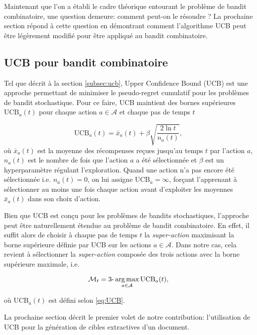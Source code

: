 Maintenant que l'on a établi le cadre théorique entourant le problème de bandit 
combinatoire, une question demeure: comment peut-on le résoudre ?
La prochaine section répond à cette question en démontrant 
comment l'algorithme UCB peut être légèrement modifié pour 
être appliqué au bandit combinatoire.

\subsection{UCB pour bandit combinatoire}

Tel que décrit à la section \ref{subsec:ucb}, Upper Confidence Bound (UCB) est une approche permettant 
de minimiser le pseudo-regret cumulatif pour les problèmes de bandit stochastique.
Pour ce faire, UCB maintient des bornes supérieures UCB$_a(t)$ pour chaque action 
$a \in \mathcal{A}$ et chaque pas de temps $t$

\begin{equation}
    \text{UCB}_a(t) = \bar{x}_a(t) + \beta \sqrt{\frac{2\ln t}{n_a(t)}},
    \label{eq:UCB}
\end{equation}
où $\bar{x}_a(t)$ est la moyenne des récompenses reçues jusqu'au temps $t$ par l'action $a$,
$n_a(t)$ est le nombre de fois que l'action $a$ a été sélectionnée et $\beta$ est un
hyperparamètre régulant l'exploration.
Quand une action n'a pas encore été sélectionnée i.e. $n_a(t)=0$, on 
lui assigne UCB$_a = \infty$, forçant l'apprenant à sélectionner au moins 
une fois chaque action avant d'exploiter les moyennes $\bar{x}_a(t)$
dans son choix d'action.

Bien que UCB est conçu pour les problèmes de bandits stochastiques, 
l'approche peut être 
naturellement étendue au problème de bandit combinatoire.
En effet, il suffit alors de choisir à chaque pas de temps $t$ la \textit{super-action}
maximisant la borne supérieure définie par UCB sur les actions $a \in \mathcal{A}$.
Dans notre cas, cela revient à sélectionner la \textit{super-action} composée des trois actions
avec la borne supérieure maximale, i.e.

\begin{equation}
    \mathcal{M}_t = \text{3-}\operatorname*{arg\,max}_{a \in \mathcal{A}} \text{UCB}_a(t),
    \label{eq:ucb_combi_rule}
\end{equation}

où UCB$_a(t)$ est défini selon \eqref{eq:UCB}.

La prochaine section décrit le premier volet de notre contribution:
l'utilisation de UCB pour la génération de cibles extractives 
d'un document. 

